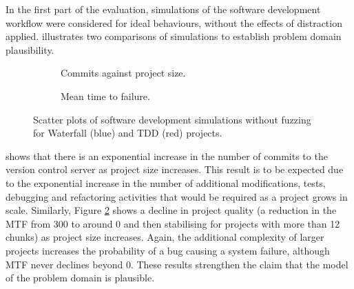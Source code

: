 \documentclass{llncs}
\begin{document}
In the first part of the evaluation, simulations of the software development workflow were considered for ideal
behaviours, without the effects of distraction applied.   illustrates two comparisons of
simulations to establish problem domain plausibility.  %
\begin{figure}[t]
  \centering

  \hfill
  \begin{subfigure}{2.3in}
    \caption{Commits against project size.}
    \label{fig:no-fuzzing:features}
  \end{subfigure}
  \hfill
  \begin{subfigure}{2.3in}
    \caption{Mean time to failure.}  
    \label{fig:no-fuzzing:mtf}
  \end{subfigure}
  \hfill

  \caption{Scatter plots of software development simulations without fuzzing for Waterfall (blue) and TDD (red)
    projects.}
  \label{fig:no-fuzzing}
\end{figure}
shows that there is an exponential increase in the number of commits to the version control server as project size
increases.  This result is to be expected due to the exponential increase in the number of additional modifications,
tests, debugging and refactoring activities that would be required as a project grows in scale.  Similarly, Figure
\ref{fig:no-fuzzing:mtf} shows a decline in project quality (a reduction in the MTF from 300 to around 0 and then
stabilising for projects with more than 12 chunks) as project size increases.  Again, the additional complexity of
larger projects increases the probability of a bug causing a system failure, although MTF never declines beyond 0.
These results strengthen the claim that the model of the problem domain is plausible.
\end{document}
